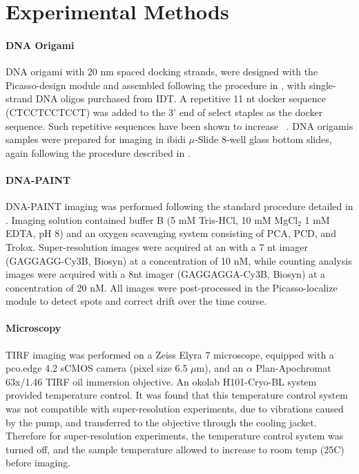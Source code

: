 \section{Experimental Methods}


\paragraph{DNA Origami}
DNA origami with 20 nm spaced docking strands, were designed with the Picasso-design module \cite{schnitzbauer_2017}
and assembled following the procedure in \cite{schnitzbauer_2017}, with single-strand DNA oligos purchased from IDT.
  A repetitive 11 nt docker sequence (CTCCTCCTCCT) was added to the 3' end of select staples as the docker sequence.
  Such repetitive sequences have been shown to increase \pon~\citep{civitci_2020}.
  DNA origamis samples were prepared for imaging in ibidi $\mu$-Slide 8-well glass bottom slides, 
  again following the procedure described in \cite{schnitzbauer_2017}. 
  
\paragraph{DNA-PAINT}
DNA-PAINT imaging was performed following the standard procedure detailed in \cite{schnitzbauer_2017}. 
  Imaging solution contained buffer B (5 mM Tris-HCl, 10 mM MgCl$_2$ 1 mM EDTA, pH 8) and an oxygen scavenging system consisting of PCA, PCD, and Trolox.
  Super-resolution images were acquired at an with a 7 nt imager (GAGGAGG-Cy3B, Biosyn) at a concentration of 10 nM,
  while counting analysis images were acquired with a 8nt imager (GAGGAGGA-Cy3B, Biosyn) at a concentration of 20 nM.
  All images were post-processed in the Picasso-localize module to detect spots and correct drift over the time course. 

\paragraph{Microscopy}

TIRF imaging was performed on a Zeiss Elyra 7 microscope, equipped with 
a pco.edge 4.2 sCMOS camera (pixel size 6.5 $\mu$m), and an $\alpha$ 
Plan-Apochromat 63x/1.46 TIRF oil immersion objective.
  An okolab H101-Cryo-BL system provided temperature control. 
  It was found that this temperature control system was not compatible with super-resolution experiments, 
  due to vibrations caused by the pump, and transferred to the objective through the cooling jacket.
  Therefore for super-resolution experiments, the temperature control system was turned off, 
  and the sample temperature allowed to increase to room temp (25\textdegree C) before imaging.